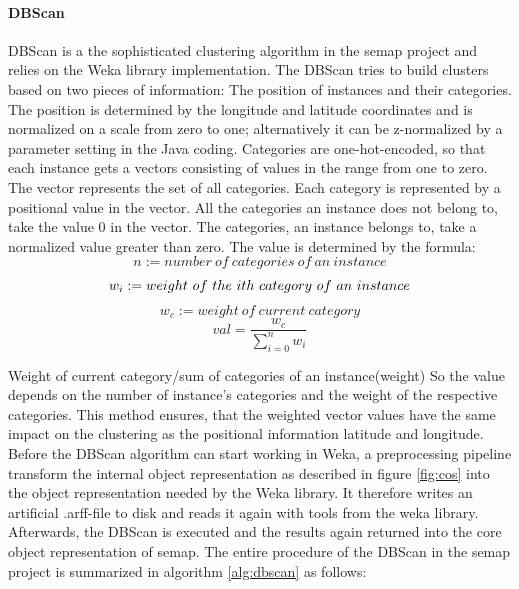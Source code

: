 \paragraph{DBScan}
DBScan is a the sophisticated clustering algorithm in the semap project and relies on the Weka library implementation. The DBScan tries to build clusters based on two pieces of information: The position of instances and their categories. The position is determined by the longitude and latitude coordinates and is normalized on a scale from zero to one; alternatively it can be z-normalized by a parameter setting in the Java coding. Categories are one-hot-encoded, so that each instance gets a vectors consisting of values in the range from one to zero. The vector represents the set of all categories. Each category is represented by a positional value in the vector. All the categories an instance does not belong to, take the value 0 in the vector. The categories, an instance belongs to, take a normalized value greater than zero. The value is determined by the formula: 
\begin{equation}
n := number~of~categories~of~an~instance
\end{equation}
\begin{equation}
w_i := weight~of~the~i\-th~category~of~an~instance
\end{equation}
\begin{equation}
w_c := weight~of~current~category
\end{equation}
\begin{equation}\label{eq:normalization}
val = \frac{w_c}{\sum_{i=0}^{n}w_i}
\end{equation}


Weight of current category/sum of categories of an instance(weight)
So the value depends on the number of instance’s categories and the weight of the respective categories. This method ensures, that the weighted vector values have the same impact on the clustering as the positional information latitude and longitude. Before the DBScan algorithm can start working in Weka, a preprocessing pipeline transform the internal object representation as described in figure \ref{fig:cos} into the object representation needed by the Weka library. It therefore writes an artificial .arff-file to disk and reads it again with tools from the weka library. Afterwards, the DBScan is executed and the results again returned into the core object representation of semap. The entire procedure of the DBScan in the semap project is summarized in algorithm \ref{alg:dbscan} as follows:

